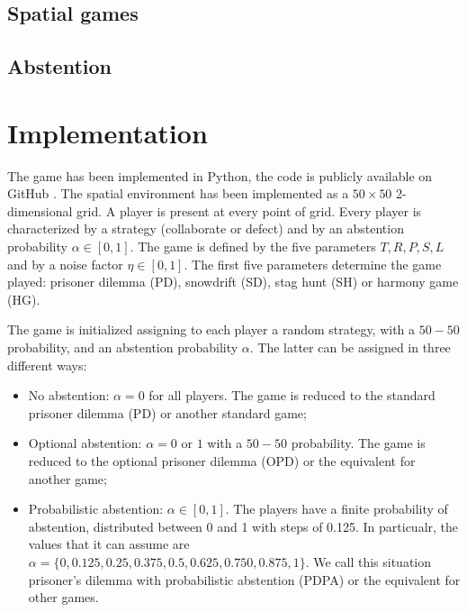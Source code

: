 \documentclass[12pt,oneside,a4paper,fleqn]{article}
\begin{document}
\subsection{Spatial games}


\subsection{Abstention}


\section{Implementation}
The game has been implemented in Python, the code is publicly available on GitHub \cite{montalti2023}.
The spatial environment has been implemented as a $50 \times 50$ 2-dimensional grid.
A player is present at every point of grid.
Every player is characterized by a strategy (collaborate or defect) and by an abstention probability $\alpha \in [0,1]$.
The game is defined by the five parameters $T, R,  P, S, L$ and by a noise factor $\eta \in [0,1]$.
The first five parameters determine the game played: prisoner dilemma (PD), snowdrift (SD), stag hunt (SH) or harmony game (HG).

The game is initialized assigning to each player a random strategy, with a $50-50$ probability, and an abstention probability $\alpha$. The latter can be assigned in three different ways:
\begin{itemize}
    \item No abstention: $\alpha = 0$ for all players. The game is reduced to the standard prisoner dilemma (PD) or another standard game;
    \item Optional abstention: $\alpha = 0$ or $1$ with a $50-50$ probability. The game is reduced to the optional prisoner dilemma (OPD) or the equivalent for another game;
    \item Probabilistic abstention: $\alpha \in [0,1]$. The players have a finite probability of abstention, distributed between 0 and 1 with steps of 0.125. In particualr, the values that it can assume are
    $\alpha = \{0, 0.125, 0.25, 0.375, 0.5, 0.625, 0.750, 0.875, 1 \}$.
    We call this situation prisoner's dilemma with probabilistic abstention (PDPA) or the equivalent for other games.
\end{itemize}
\end{document}
